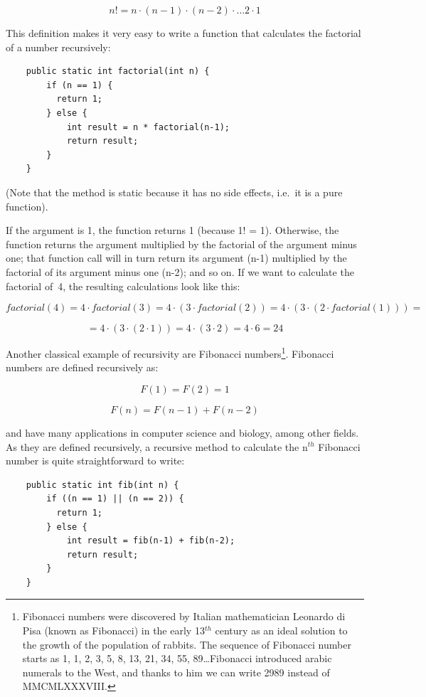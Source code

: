 $$ n! = n \cdot (n - 1) \cdot (n - 2) \cdot \ldots 2 \cdot 1 $$

This definition makes it very easy to write a function that calculates
the factorial of a number recursively: 

\begin{verbatim}
    public static int factorial(int n) {
        if (n == 1) {
          return 1; 
        } else {
            int result = n * factorial(n-1);
            return result;
        }
    }
\end{verbatim}

(Note that the method is static because it has no side effects,
i.e.~it is a pure function). 

If the argument is 1, the function returns 1 (because 1! =
1). Otherwise, the function returns the argument multiplied by the
factorial of the argument minus one; that function call will in turn
return its argument (n-1) multiplied by the factorial of its argument
minus one (n-2); and so on. If we want to calculate the factorial
of~4, the resulting calculations look like this: 

$$ factorial(4) = 4 \cdot factorial(3) = 
   4 \cdot (3 \cdot factorial(2)) = 
   4 \cdot (3 \cdot (2 \cdot factorial(1))) = $$ 

$$ = 4 \cdot (3 \cdot (2 \cdot 1)) = 4 \cdot (3 \cdot 2) = 4 \cdot 6 = 24 $$

Another classical example of recursivity are Fibonacci
numbers\footnote{Fibonacci numbers were discovered by Italian mathematician
Leonardo di Pisa (known as Fibonacci) in the early 13$^{th}$ century
as an ideal solution to the growth of the population of rabbits. The
sequence of Fibonacci number starts as 1, 1, 2, 3, 5, 8, 13, 21, 34,
55, 89\ldots Fibonacci introduced arabic numerals to the West, and
thanks to him we can write 2989 instead of MMCMLXXXVIII.}.
Fibonacci numbers are defined recursively as:

$$ F(1) = F(2) = 1 $$

$$ F(n) = F(n-1) + F(n-2) $$

and have many applications in computer science and biology, among
other fields. As they are defined recursively, a recursive method to
calculate the n$^{th}$ Fibonacci number is quite straightforward to
write: 

\begin{verbatim}
    public static int fib(int n) {
        if ((n == 1) || (n == 2)) {
          return 1; 
        } else {
            int result = fib(n-1) + fib(n-2);
            return result;
        }
    }
\end{verbatim}

